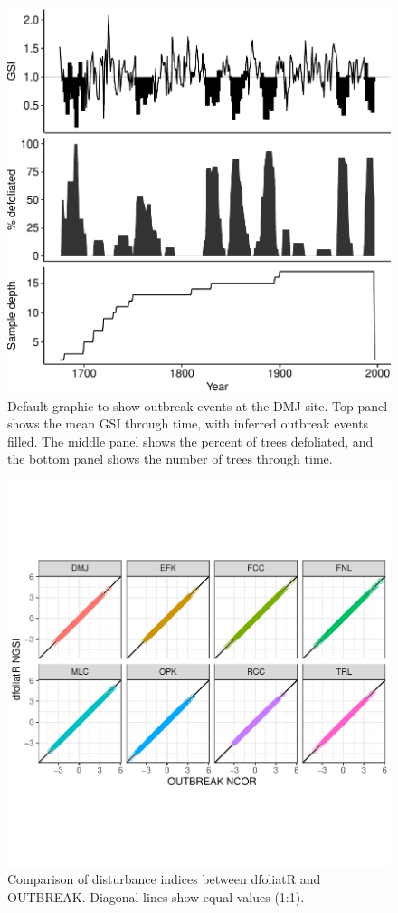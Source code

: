 \documentclass[review]{elsarticle} %
\makeatletter
\def\maxwidth{\ifdim\Gin@nat@width>\linewidth\linewidth
\else\Gin@nat@width\fi}
\let\Oldincludegraphics\includegraphics
\renewcommand{\includegraphics}[1]{\Oldincludegraphics[width=\maxwidth]{#1}}
\makeatother
\begin{document}
\begin{figure}
\centering
\includegraphics{../paper_elsevier/Output/site-plot.pdf}
\caption{\label{fig:fig-obr}Default graphic to show outbreak events at the DMJ site. Top panel shows the mean GSI through time, with inferred outbreak events filled. The middle panel shows the percent of trees defoliated, and the bottom panel shows the number of trees through time.}
\end{figure}

\begin{figure}
\centering
\includegraphics{../paper_elsevier/Output/plot-trees-df-obr.pdf}
\caption{\label{fig:df-obr-1-1}Comparison of disturbance indices between dfoliatR and OUTBREAK. Diagonal lines show equal values (1:1).}
\end{figure}
\end{document}
